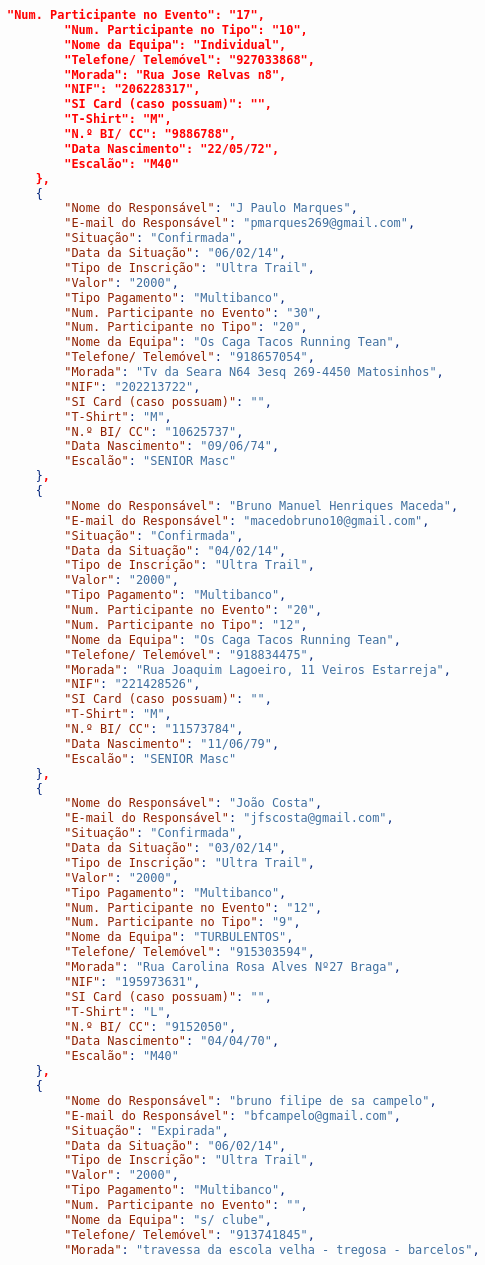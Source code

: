 \documentclass[11pt,a4paper]{report}
\begin{document}
\begin{lstlisting}[language=json,firstnumber=1]
		"Num. Participante no Evento": "17",
		"Num. Participante no Tipo": "10",
		"Nome da Equipa": "Individual",
		"Telefone/ Telemóvel": "927033868",
		"Morada": "Rua Jose Relvas n8",
		"NIF": "206228317",
		"SI Card (caso possuam)": "",
		"T-Shirt": "M",
		"N.º BI/ CC": "9886788",
		"Data Nascimento": "22/05/72",
		"Escalão": "M40"
	},
	{
		"Nome do Responsável": "J Paulo Marques",
		"E-mail do Responsável": "pmarques269@gmail.com",
		"Situação": "Confirmada",
		"Data da Situação": "06/02/14",
		"Tipo de Inscrição": "Ultra Trail",
		"Valor": "2000",
		"Tipo Pagamento": "Multibanco",
		"Num. Participante no Evento": "30",
		"Num. Participante no Tipo": "20",
		"Nome da Equipa": "Os Caga Tacos Running Tean",
		"Telefone/ Telemóvel": "918657054",
		"Morada": "Tv da Seara N64 3esq 269-4450 Matosinhos",
		"NIF": "202213722",
		"SI Card (caso possuam)": "",
		"T-Shirt": "M",
		"N.º BI/ CC": "10625737",
		"Data Nascimento": "09/06/74",
		"Escalão": "SENIOR Masc"
	},
	{
		"Nome do Responsável": "Bruno Manuel Henriques Maceda",
		"E-mail do Responsável": "macedobruno10@gmail.com",
		"Situação": "Confirmada",
		"Data da Situação": "04/02/14",
		"Tipo de Inscrição": "Ultra Trail",
		"Valor": "2000",
		"Tipo Pagamento": "Multibanco",
		"Num. Participante no Evento": "20",
		"Num. Participante no Tipo": "12",
		"Nome da Equipa": "Os Caga Tacos Running Tean",
		"Telefone/ Telemóvel": "918834475",
		"Morada": "Rua Joaquim Lagoeiro, 11 Veiros Estarreja",
		"NIF": "221428526",
		"SI Card (caso possuam)": "",
		"T-Shirt": "M",
		"N.º BI/ CC": "11573784",
		"Data Nascimento": "11/06/79",
		"Escalão": "SENIOR Masc"
	},
	{
		"Nome do Responsável": "João Costa",
		"E-mail do Responsável": "jfscosta@gmail.com",
		"Situação": "Confirmada",
		"Data da Situação": "03/02/14",
		"Tipo de Inscrição": "Ultra Trail",
		"Valor": "2000",
		"Tipo Pagamento": "Multibanco",
		"Num. Participante no Evento": "12",
		"Num. Participante no Tipo": "9",
		"Nome da Equipa": "TURBULENTOS",
		"Telefone/ Telemóvel": "915303594",
		"Morada": "Rua Carolina Rosa Alves Nº27 Braga",
		"NIF": "195973631",
		"SI Card (caso possuam)": "",
		"T-Shirt": "L",
		"N.º BI/ CC": "9152050",
		"Data Nascimento": "04/04/70",
		"Escalão": "M40"
	},
	{
		"Nome do Responsável": "bruno filipe de sa campelo",
		"E-mail do Responsável": "bfcampelo@gmail.com",
		"Situação": "Expirada",
		"Data da Situação": "06/02/14",
		"Tipo de Inscrição": "Ultra Trail",
		"Valor": "2000",
		"Tipo Pagamento": "Multibanco",
		"Num. Participante no Evento": "",
		"Nome da Equipa": "s/ clube",
		"Telefone/ Telemóvel": "913741845",
		"Morada": "travessa da escola velha - tregosa - barcelos",

\end{lstlisting}
\end{document}
